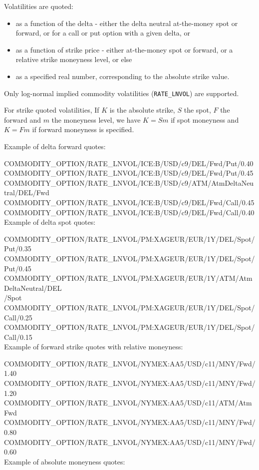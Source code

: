 Volatilities are quoted:
\begin{itemize}
\item as a function of the delta - either the delta neutral at-the-money spot or forward, or for a call or put option with a given delta, or
\item as a function of strike price - either at-the-money spot or forward, or a  relative strike moneyness level, or else
\item as a specified real number, corresponding to the absolute strike value.
\end{itemize}
 Only log-normal implied commodity volatilities ({\tt RATE\_LNVOL}) are supported.

For strike quoted volatilities, If $K$ is the absolute strike, $S$ the spot, $F$ the forward and $m$ the moneyness level, we have $K=Sm$ if spot
moneyness and $K=Fm$ if forward moneyness is specified.

\medskip
Example of delta forward quotes:

COMMODITY\_OPTION/RATE\_LNVOL/ICE:B/USD/c9/DEL/Fwd/Put/0.40\\
COMMODITY\_OPTION/RATE\_LNVOL/ICE:B/USD/c9/DEL/Fwd/Put/0.45\\
COMMODITY\_OPTION/RATE\_LNVOL/ICE:B/USD/c9/ATM/AtmDeltaNeutral/DEL/Fwd\\
COMMODITY\_OPTION/RATE\_LNVOL/ICE:B/USD/c9/DEL/Fwd/Call/0.45\\
COMMODITY\_OPTION/RATE\_LNVOL/ICE:B/USD/c9/DEL/Fwd/Call/0.40\\
\medskip
Example of delta spot quotes:

COMMODITY\_OPTION/RATE\_LNVOL/PM:XAGEUR/EUR/1Y/DEL/Spot/Put/0.35\\
COMMODITY\_OPTION/RATE\_LNVOL/PM:XAGEUR/EUR/1Y/DEL/Spot/Put/0.45\\
COMMODITY\_OPTION/RATE\_LNVOL/PM:XAGEUR/EUR/1Y/ATM/AtmDeltaNeutral/DEL\\/Spot\\
COMMODITY\_OPTION/RATE\_LNVOL/PM:XAGEUR/EUR/1Y/DEL/Spot/Call/0.25\\
COMMODITY\_OPTION/RATE\_LNVOL/PM:XAGEUR/EUR/1Y/DEL/Spot/Call/0.15\\
\medskip
Example of forward strike quotes with relative moneyness:

COMMODITY\_OPTION/RATE\_LNVOL/NYMEX:AA5/USD/c11/MNY/Fwd/1.40\\
COMMODITY\_OPTION/RATE\_LNVOL/NYMEX:AA5/USD/c11/MNY/Fwd/1.20\\
COMMODITY\_OPTION/RATE\_LNVOL/NYMEX:AA5/USD/c11/ATM/AtmFwd\\
COMMODITY\_OPTION/RATE\_LNVOL/NYMEX:AA5/USD/c11/MNY/Fwd/0.80\\
COMMODITY\_OPTION/RATE\_LNVOL/NYMEX:AA5/USD/c11/MNY/Fwd/0.60	\\
\medskip
Example of absolute moneyness quotes:


